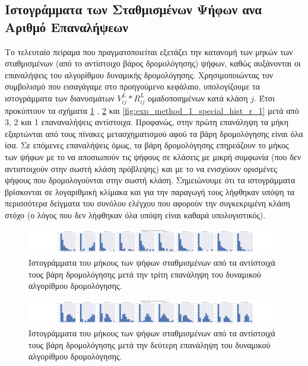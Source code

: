 \subsection{Ιστογράμματα των Σταθμισμένων Ψήφων ανα Αριθμό Επαναλήψεων}

Το τελευταίο πείραμα που πραγματοποιείται εξετάζει την κατανομή των μηκών των σταθμισμένων (από το αντίστοιχο βάρος δρομολόγησης) ψήφων, καθώς αυξάνονται οι επαναλήψεις του αλγορίθμου δυναμικής δρομολόγησης. Χρησιμοποιώντας τον συμβολισμό που εισαγάγαμε στο προηγούμενο κεφάλαιο, υπολογίζουμε τα ιστογράμματα των διανυσμάτων $V^L_{ij} \ast R^L_{ij}$ ομαδοποιημένων κατά κλάση $j$. Έτσι προκύπτουν τα σχήματα \ref{fig:exp_method_1_special_hist_r_3} , \ref{fig:exp_method_1_special_hist_r_2} και \ref{fig:exp_method_1_special_hist_r_1} μετά από 3, 2 και 1 επαναναλήψεις αντίστοιχα. Προφανώς, στην πρώτη επανάληψη τα μήκη εξαρτώνται από τους πίνακες μετασχηματισμού αφού τα βάρη δρομολόγησης είναι όλα ίσα. Σε επόμενες επαναλήψεις όμως, τα βάρη δρομολόγησης επηρεάζουν το μήκος των ψήφων με το να αποσιωπούν τις ψήφους σε κλάσεις με μικρή συμφωνία (που δεν αντιστοιχούν στην σωστή κλάση πρόβλεψης) και με το να ενισχύουν ορισμένες ψήφους που δρομολογούνται στην σωστή κλάση. Σημειώνουμε ότι τα ιστογράμματα βρίσκονται σε λογαριθμική κλίμακα και για την παραγωγή τους λήφθηκαν υπόψη τα περισσότερα δείγματα του συνόλου ελέγχου που αφορούν την συγκεκριμένη κλάση στόχο (ο λόγος που δεν λήφθηκαν όλα υπόψη είναι καθαρά υπολογιστικός).
\begin{figure}[h]
    \centering
    \includegraphics[trim={14cm 0 13cm 0},clip, width=0.99\textwidth]{images/chapter experiments/method 1/image 14/hists_for_class_1_r_3.png}
    \caption{Ιστογράμματα του μήκους των ψήφων σταθμισμένων από τα αντίστοιχά τους βάρη δρομολόγησης μετά την τρίτη επανάληψη του δυναμικού αλγορίθμου δρομολόγησης.}
    \label{fig:exp_method_1_special_hist_r_3}
  \end{figure}

  \begin{figure}[h]
    \centering
    \includegraphics[trim={14cm 0 13cm 0},clip, width=0.99\textwidth]{images/chapter experiments/method 1/image 14/hists_for_class_1_r_2.png}
    \caption{Ιστογράμματα του μήκους των ψήφων σταθμισμένων από τα αντίστοιχά τους βάρη δρομολόγησης μετά την δεύτερη επανάληψη του δυναμικού αλγορίθμου δρομολόγησης.}
    \label{fig:exp_method_1_special_hist_r_2}
  \end{figure}

